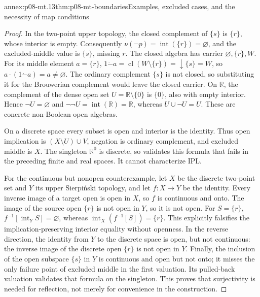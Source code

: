 \begin{annexitem}{annex:p08-mt.13}{thm:p08-mt-boundaries}{Examples, excluded cases, and the necessity of map conditions}
\begin{proof}
In the two-point upper topology, the closed complement of \(\{s\}\)
is \(\{r\}\), whose interior is empty. Consequently
\(\nu(\neg p)=\operatorname{int}(\{r\})=\varnothing\), and the
excluded-middle value is \(\{s\}\), missing \(r\).
The closed algebra has carrier \(\varnothing,\{r\},W\). For its
middle element \(a=\{r\}\),
\(1\mathbin{\dot{-}}a=\operatorname{cl}(W\setminus\{r\})
=\downarrow\{s\}=W\), so
\(a\cdot(1\mathbin{\dot{-}}a)=a\ne\varnothing\).
The ordinary complement \(\{s\}\) is not closed, so substituting it
for the Brouwerian complement would leave the closed carrier.
On \(\mathbb R\), the complement of the dense open set
\(U=\mathbb R\setminus\{0\}\) is \(\{0\}\), also with empty
interior. Hence \(\neg U=\varnothing\) and
\(\neg\neg U=\operatorname{int}(\mathbb R)=\mathbb R\), whereas
\(U\cup\neg U=U\). These are concrete non-Boolean open algebras.

On a discrete space every subset is open and interior is the identity.
Thus open implication is \((X\setminus U)\cup V\), negation is
ordinary complement, and excluded middle is \(X\). The singleton
\(\mathbb R^0\) is discrete, so validates this formula that fails in
the preceding finite and real spaces. It cannot characterize IPL.

For the continuous but nonopen counterexample, let \(X\) be the
discrete two-point set and \(Y\) its upper Sierpi\'nski topology, and
let \(f:X\to Y\) be the identity. Every inverse image of a target
open is open in \(X\), so \(f\) is continuous and onto. The image
of the source open \(\{r\}\) is not open in \(Y\), so it is not
open. For \(S=\{r\}\),
\(f^{-1}[\operatorname{int}_Y S]=\varnothing\), whereas
\(\operatorname{int}_X(f^{-1}[S])=\{r\}\). This explicitly falsifies
the implication-preserving interior equality without openness.
In the reverse direction, the identity from \(Y\) to the discrete
space is open, but not continuous: the inverse image of the discrete
open \(\{r\}\) is not open in \(Y\).
Finally, the inclusion of the open subspace \(\{s\}\) in \(Y\) is
continuous and open but not onto; it misses the only failure point of
excluded middle in the first valuation. Its pulled-back valuation
validates that formula on the singleton. This proves that surjectivity
is needed for reflection, not merely for convenience in the construction.
\end{proof}
\end{annexitem}
